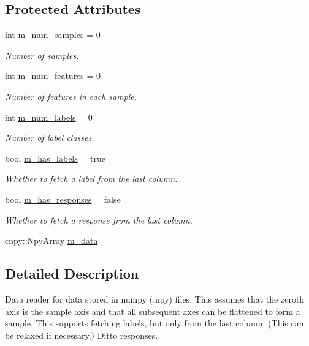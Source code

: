 \subsection*{Protected Attributes}
\begin{DoxyCompactItemize}
\item 
int \hyperlink{classlbann_1_1numpy__reader_a5e0d81c07c950a2d81645566a2ccd965}{m\+\_\+num\+\_\+samples} = 0
\begin{DoxyCompactList}\small\item\em Number of samples. \end{DoxyCompactList}\item 
int \hyperlink{classlbann_1_1numpy__reader_aef25f95077f565fa9616ec353b93f675}{m\+\_\+num\+\_\+features} = 0
\begin{DoxyCompactList}\small\item\em Number of features in each sample. \end{DoxyCompactList}\item 
int \hyperlink{classlbann_1_1numpy__reader_ab311c3567e1ecc1770a4bc299ab0a3e2}{m\+\_\+num\+\_\+labels} = 0
\begin{DoxyCompactList}\small\item\em Number of label classes. \end{DoxyCompactList}\item 
bool \hyperlink{classlbann_1_1numpy__reader_a0e8caa5609e706bf909b78c4c35377b8}{m\+\_\+has\+\_\+labels} = true
\begin{DoxyCompactList}\small\item\em Whether to fetch a label from the last column. \end{DoxyCompactList}\item 
bool \hyperlink{classlbann_1_1numpy__reader_a7567338be86dff81afece19d031a942d}{m\+\_\+has\+\_\+responses} = false
\begin{DoxyCompactList}\small\item\em Whether to fetch a response from the last column. \end{DoxyCompactList}\item 
cnpy\+::\+Npy\+Array \hyperlink{classlbann_1_1numpy__reader_a6d43a1eae0fedb6fa237b24cef8f37fa}{m\+\_\+data}
\end{DoxyCompactItemize}


\subsection{Detailed Description}
Data reader for data stored in numpy (.npy) files. This assumes that the zero\textquotesingle{}th axis is the sample axis and that all subsequent axes can be flattened to form a sample. This supports fetching labels, but only from the last column. (This can be relaxed if necessary.) Ditto responses. 

